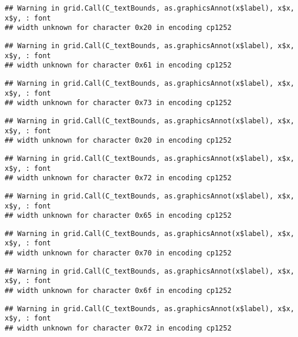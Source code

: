 \documentclass[
]{article}
\begin{document}
\begin{verbatim}
## Warning in grid.Call(C_textBounds, as.graphicsAnnot(x$label), x$x, x$y, : font
## width unknown for character 0x20 in encoding cp1252
\end{verbatim}

\begin{verbatim}
## Warning in grid.Call(C_textBounds, as.graphicsAnnot(x$label), x$x, x$y, : font
## width unknown for character 0x61 in encoding cp1252
\end{verbatim}

\begin{verbatim}
## Warning in grid.Call(C_textBounds, as.graphicsAnnot(x$label), x$x, x$y, : font
## width unknown for character 0x73 in encoding cp1252
\end{verbatim}

\begin{verbatim}
## Warning in grid.Call(C_textBounds, as.graphicsAnnot(x$label), x$x, x$y, : font
## width unknown for character 0x20 in encoding cp1252
\end{verbatim}

\begin{verbatim}
## Warning in grid.Call(C_textBounds, as.graphicsAnnot(x$label), x$x, x$y, : font
## width unknown for character 0x72 in encoding cp1252
\end{verbatim}

\begin{verbatim}
## Warning in grid.Call(C_textBounds, as.graphicsAnnot(x$label), x$x, x$y, : font
## width unknown for character 0x65 in encoding cp1252
\end{verbatim}

\begin{verbatim}
## Warning in grid.Call(C_textBounds, as.graphicsAnnot(x$label), x$x, x$y, : font
## width unknown for character 0x70 in encoding cp1252
\end{verbatim}

\begin{verbatim}
## Warning in grid.Call(C_textBounds, as.graphicsAnnot(x$label), x$x, x$y, : font
## width unknown for character 0x6f in encoding cp1252
\end{verbatim}

\begin{verbatim}
## Warning in grid.Call(C_textBounds, as.graphicsAnnot(x$label), x$x, x$y, : font
## width unknown for character 0x72 in encoding cp1252
\end{verbatim}
\end{document}
